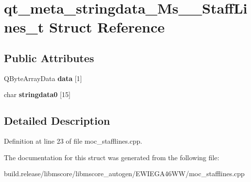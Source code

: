 \hypertarget{structqt__meta__stringdata___ms_____staff_lines__t}{}\section{qt\+\_\+meta\+\_\+stringdata\+\_\+\+Ms\+\_\+\+\_\+\+Staff\+Lines\+\_\+t Struct Reference}
\label{structqt__meta__stringdata___ms_____staff_lines__t}
\subsection*{Public Attributes}
\begin{DoxyCompactItemize}
\item 
\mbox{\label{structqt__meta__stringdata___ms_____staff_lines__t_af17c916a6d4311c5d831fe84f6fef446}} 
Q\+Byte\+Array\+Data {\bfseries data} \mbox{[}1\mbox{]}
\item 
\mbox{\label{structqt__meta__stringdata___ms_____staff_lines__t_a59c10c79c3292065b3382bd92f20ba3f}} 
char {\bfseries stringdata0} \mbox{[}15\mbox{]}
\end{DoxyCompactItemize}


\subsection{Detailed Description}


Definition at line 23 of file moc\+\_\+stafflines.\+cpp.



The documentation for this struct was generated from the following file\+:\begin{DoxyCompactItemize}
\item 
build.\+release/libmscore/libmscore\+\_\+autogen/\+E\+W\+I\+E\+G\+A46\+W\+W/moc\+\_\+stafflines.\+cpp\end{DoxyCompactItemize}
